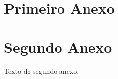 \begin{anexosenv}

\partanexos

\chapter{Primeiro Anexo}

\chapter{Segundo Anexo}

Texto do segundo anexo.

\end{anexosenv}

